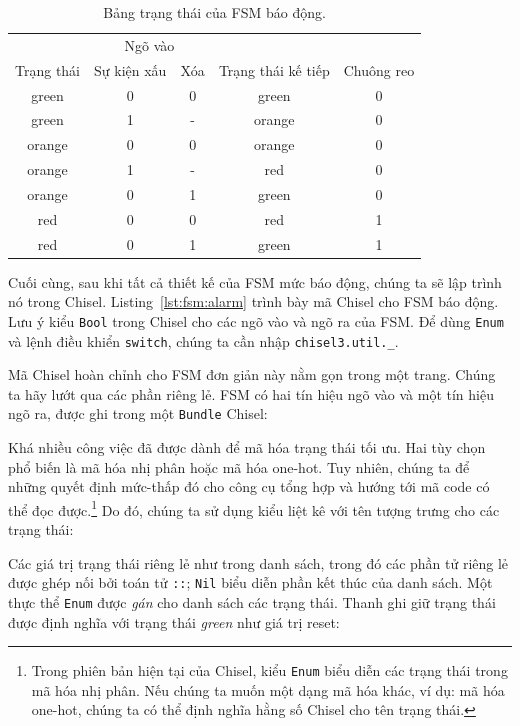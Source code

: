 \documentclass[%
    10pt,
    headinclude, footexclude,
    openright, %
    notitlepage,
    cleardoubleempty,
    headsepline,
    pointlessnumbers,
    bibtotoc, idxtotoc,
    ]{scrbook}
\newcommand{\code}[1]{{\small{\texttt{#1}}}}
\begin{document}
\begin{table}
\centering
\caption{Bảng trạng thái của FSM báo động.}
\begin{tabular}{ccccc}
\toprule
& \multicolumn{2}{c}{Ngõ vào} \\
\cmidrule{2-3}
Trạng thái &  Sự kiện xấu & Xóa & Trạng thái kế tiếp & Chuông reo \\
\midrule
green & 0 & 0 & green & 0 \\
green & 1 & - & orange & 0 \\
orange & 0 & 0 & orange & 0 \\
orange & 1 & - & red & 0 \\
orange & 0 & 1 & green & 0 \\
red & 0 & 0 & red & 1 \\
red & 0 & 1 & green & 1 \\
\bottomrule
\end{tabular}
\label{tab:state:table}
\end{table}

Cuối cùng, sau khi tất cả thiết kế của FSM mức báo động, chúng ta sẽ lập trình nó trong Chisel. Listing~\ref{lst:fsm:alarm} trình bày mã Chisel cho FSM báo động. Lưu ý kiểu \code{Bool} trong Chisel cho các ngõ vào và ngõ ra của FSM. Để dùng \code{Enum} và lệnh điều khiển \code{switch}, chúng ta cần nhập \code{chisel3.util.\_}.


Mã Chisel hoàn chỉnh cho FSM đơn giản này nằm gọn trong một trang.
Chúng ta hãy lướt qua các phần riêng lẻ.
FSM có hai tín hiệu ngõ vào và một tín hiệu ngõ ra, được ghi trong một \code{Bundle} Chisel:
%

\noindent Khá nhiều công việc đã được dành để mã hóa trạng thái tối ưu. Hai tùy chọn phổ biến là mã hóa nhị phân hoặc mã hóa one-hot. Tuy nhiên, chúng ta để những quyết định mức-thấp đó cho công cụ tổng hợp và hướng tới mã code có thể đọc được.\footnote{Trong phiên bản hiện tại của Chisel, kiểu \code{Enum} biểu diễn các trạng thái trong mã hóa nhị phân. Nếu chúng ta muốn một dạng mã hóa khác, ví dụ: mã hóa one-hot, chúng ta có thể định nghĩa hằng số Chisel cho tên trạng thái.} Do đó, chúng ta sử dụng kiểu liệt kê với tên tượng trưng cho các trạng thái: 


\noindent Các giá trị trạng thái riêng lẻ như trong danh sách, trong đó các phần tử riêng lẻ được ghép nối bởi toán tử \code{::}; \code{Nil} biểu diễn phần kết thúc của danh sách. Một thực thể \code{Enum} được \emph{gán} cho danh sách các trạng thái.
Thanh ghi giữ trạng thái được định nghĩa với trạng thái \emph{green} như giá trị reset:
\end{document}
